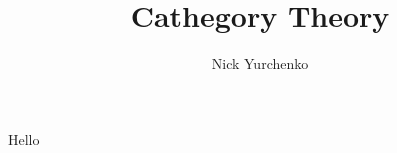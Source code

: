 \documentclass[10pt,a4paper,titlepage]{article}
\author{Nick Yurchenko}
\title{Cathegory Theory}
\begin{document}
Hello
\end{document}
